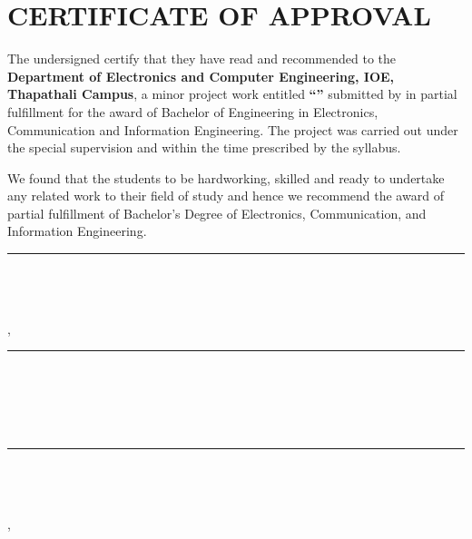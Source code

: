 \begingroup
\let\clearpage\relax
\vspace*{1.3in}
\chapter*{CERTIFICATE OF APPROVAL}
\endgroup
{}

\noindent The undersigned certify that they have read and recommended to the
\textbf{Department of Electronics and Computer Engineering, IOE, Thapathali Campus},
a minor project work entitled \textbf{``\cTitle''} submitted by
\textbf{\authorList} in partial fulfillment for the award of Bachelor of
Engineering in Electronics, Communication and Information Engineering.
The project was carried out under the special supervision and within the time
prescribed by the syllabus.

We found that the students to be hardworking, skilled and ready to undertake
any related work to their field of study and hence we recommend the award of
partial fulfillment of Bachelor's Degree of Electronics, Communication, and
Information Engineering.

\vspace{2em}

\noindent
\begin{minipage}[t]{1.0\textwidth}
	\rule{6cm}{0.2mm} \\
	\cSupervisorTitle \\
	\cSupervisor \\
	\cSupervisorDept, \cSupervisorAddress
\end{minipage}

\vspace{2em}
\begin{minipage}[t]{1.0\textwidth}
	\vspace{1em}
	\rule{6cm}{0.2mm} \\
	\cExternalExaminerTitle \\
	\cExternalExaminer \\
	\cExternalExaminerDept \\
	\cExternalExaminerAddress
\end{minipage}


\vspace{2em}
\begin{minipage}[t]{1.0\textwidth}
	\vspace{1em}
	\rule{6cm}{0.2mm} \\
	\cHODTitle \\
	\cHOD \\
	\cHODDept, \cHODAddress
\end{minipage}

\vspace{0.5cm}
\noindent\cDate
